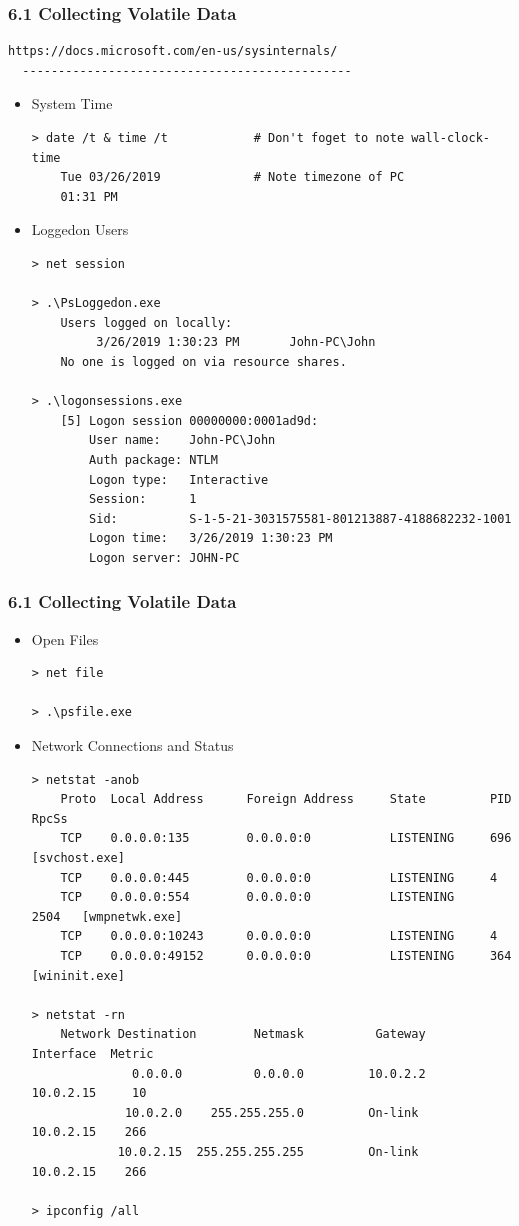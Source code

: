 \begin{frame}[fragile]
  \frametitle{6.1 Collecting Volatile Data}
  \begin{lstlisting}[basicstyle=\tiny]
  https://docs.microsoft.com/en-us/sysinternals/
  ----------------------------------------------
  \end{lstlisting}
  \begin{itemize}
        \item System Time
\begin{lstlisting}[basicstyle=\tiny]
> date /t & time /t            # Don't foget to note wall-clock-time
    Tue 03/26/2019             # Note timezone of PC
    01:31 PM
\end{lstlisting}
        \item Loggedon Users
\begin{lstlisting}[basicstyle=\tiny]
> net session

> .\PsLoggedon.exe
    Users logged on locally:
         3/26/2019 1:30:23 PM       John-PC\John
    No one is logged on via resource shares.

> .\logonsessions.exe
    [5] Logon session 00000000:0001ad9d:
        User name:    John-PC\John
        Auth package: NTLM
        Logon type:   Interactive
        Session:      1
        Sid:          S-1-5-21-3031575581-801213887-4188682232-1001
        Logon time:   3/26/2019 1:30:23 PM
        Logon server: JOHN-PC
\end{lstlisting}
    \end{itemize}
\end{frame}


\begin{frame}[fragile]
  \frametitle{6.1 Collecting Volatile Data}
  \begin{itemize}
        \item Open Files
\begin{lstlisting}[basicstyle=\tiny]
> net file

> .\psfile.exe
\end{lstlisting}
        \item Network Connections and Status
\begin{lstlisting}[basicstyle=\tiny]
> netstat -anob
    Proto  Local Address      Foreign Address     State         PID    RpcSs
    TCP    0.0.0.0:135        0.0.0.0:0           LISTENING     696    [svchost.exe]
    TCP    0.0.0.0:445        0.0.0.0:0           LISTENING     4
    TCP    0.0.0.0:554        0.0.0.0:0           LISTENING     2504   [wmpnetwk.exe]
    TCP    0.0.0.0:10243      0.0.0.0:0           LISTENING     4
    TCP    0.0.0.0:49152      0.0.0.0:0           LISTENING     364    [wininit.exe]

> netstat -rn
    Network Destination        Netmask          Gateway       Interface  Metric
              0.0.0.0          0.0.0.0         10.0.2.2        10.0.2.15     10
             10.0.2.0    255.255.255.0         On-link         10.0.2.15    266
            10.0.2.15  255.255.255.255         On-link         10.0.2.15    266

> ipconfig /all
\end{lstlisting}
    \end{itemize}
\end{frame}


